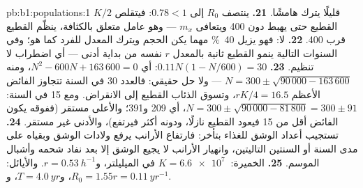 \begin{solution}{pb:b1:populations:1}
$K/2$ قليلًا يترك هامشًا.
\textbf{21.} ينتصف $R_0$ إلى $0.78 < 1$: فيتقلص القطيع حتى يهبط
دون 400 ويتعافى $m_x$ --- وهو عامل متعلق بالكثافة، ينظّم القطيع
قرب 400.
\textbf{22.} لا: فهو يزيل \qty{40}{\%} مهما يكن الحجم ويترك
المعدل للفرد كما هو؛ وفي السنوات التالية ينمو القطيع ثانية بالمعدل
$r$ نفسه من بداية أدنى --- أي اضطراب لا تنظيم.
\textbf{23.} $0.11N(1 - N/600) = 30$: أي $N^2 - 600N + 163\,600 = 0$،
ومنه $N = 300\pm\sqrt{90\,000 - 163\,600}$ --- ولا حل حقيقي: فالعدد 30 في السنة
تتجاوز الفائض الأعظم $rK/4 = 16.5$، وتسوق الذئاب
القطيع إلى الانقراض. ومع 15 في السنة: $N = 300\pm\sqrt{90\,000 -
81\,800} = 300\pm 91$، أي 209 و391؛ والأعلى مستقر
(ففوقه يكون الفائض أقل من 15 فيعود القطيع نازلًا، ودونه أكثر
فيرتفع)، والأدنى غير مستقر.
\textbf{24.} تستجيب أعداد الوشق للغذاء بتأخر: فارتفاع الأرانب يرفع
ولادات الوشق وبقياه على مدى السنة أو السنتين التاليتين، وانهيار
الأرانب لا يجيع الوشق إلا بعد نفاد شحمه وأشبال الموسم.
\textbf{25.} الخميرة: $K = \qty{6.6e7}{}$  في الميليلتر، و$r =
\qty{0.53}{h^{-1}}$. والأيائل: $R_0 = 1.55$، و$T = \qty{4.0}{yr}$، و$r =
\qty{0.11}{yr^{-1}}$.
\end{solution}
